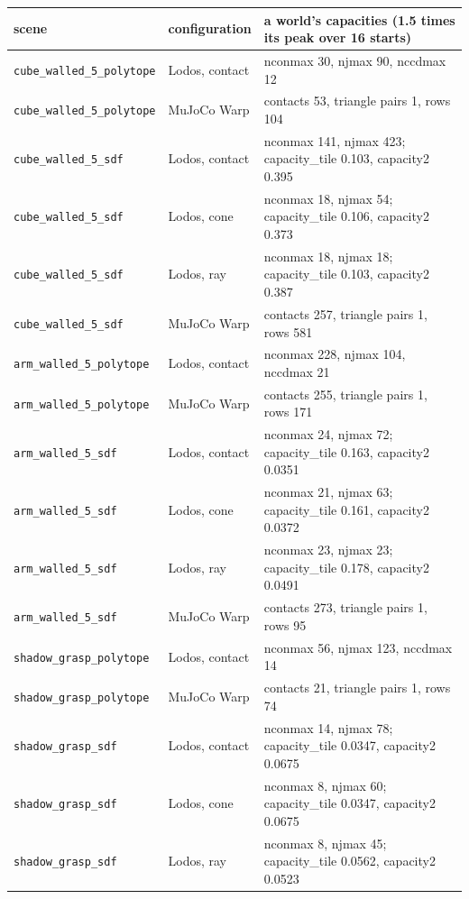 \begin{longtable}{@{}llp{9.5cm}@{}}
\toprule
scene & configuration & a world's capacities (1.5 times its peak over 16 starts) \\
\midrule
\endhead
\texttt{cube\_walled\_5\_polytope} & Lodos, contact & nconmax 30, njmax 90, nccdmax 12 \\
\texttt{cube\_walled\_5\_polytope} & MuJoCo Warp & contacts 53, triangle pairs 1, rows 104 \\
\texttt{cube\_walled\_5\_sdf} & Lodos, contact & nconmax 141, njmax 423; capacity\_tile 0.103, capacity2 0.395 \\
\texttt{cube\_walled\_5\_sdf} & Lodos, cone & nconmax 18, njmax 54; capacity\_tile 0.106, capacity2 0.373 \\
\texttt{cube\_walled\_5\_sdf} & Lodos, ray & nconmax 18, njmax 18; capacity\_tile 0.103, capacity2 0.387 \\
\texttt{cube\_walled\_5\_sdf} & MuJoCo Warp & contacts 257, triangle pairs 1, rows 581 \\
\texttt{arm\_walled\_5\_polytope} & Lodos, contact & nconmax 228, njmax 104, nccdmax 21 \\
\texttt{arm\_walled\_5\_polytope} & MuJoCo Warp & contacts 255, triangle pairs 1, rows 171 \\
\texttt{arm\_walled\_5\_sdf} & Lodos, contact & nconmax 24, njmax 72; capacity\_tile 0.163, capacity2 0.0351 \\
\texttt{arm\_walled\_5\_sdf} & Lodos, cone & nconmax 21, njmax 63; capacity\_tile 0.161, capacity2 0.0372 \\
\texttt{arm\_walled\_5\_sdf} & Lodos, ray & nconmax 23, njmax 23; capacity\_tile 0.178, capacity2 0.0491 \\
\texttt{arm\_walled\_5\_sdf} & MuJoCo Warp & contacts 273, triangle pairs 1, rows 95 \\
\texttt{shadow\_grasp\_polytope} & Lodos, contact & nconmax 56, njmax 123, nccdmax 14 \\
\texttt{shadow\_grasp\_polytope} & MuJoCo Warp & contacts 21, triangle pairs 1, rows 74 \\
\texttt{shadow\_grasp\_sdf} & Lodos, contact & nconmax 14, njmax 78; capacity\_tile 0.0347, capacity2 0.0675 \\
\texttt{shadow\_grasp\_sdf} & Lodos, cone & nconmax 8, njmax 60; capacity\_tile 0.0347, capacity2 0.0675 \\
\texttt{shadow\_grasp\_sdf} & Lodos, ray & nconmax 8, njmax 45; capacity\_tile 0.0562, capacity2 0.0523 \\

\end{longtable}
